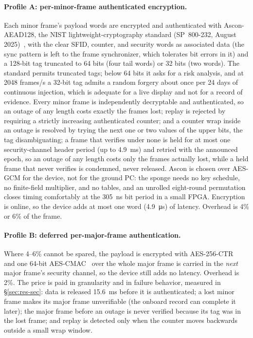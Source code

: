 \documentclass[12pt,letterpaper]{article}
\begin{document}
\paragraph{Profile A: per-minor-frame authenticated encryption.}
Each minor frame's payload words are encrypted and authenticated with Ascon-AEAD128, the
NIST lightweight-cryptography standard (SP~800-232, August 2025)~\cite{nist800232}, with
the clear SFID, counter, and security words as associated data (the sync pattern is left to
the frame synchronizer, which tolerates bit errors in it) and a 128-bit tag truncated to
64 bits (four tail words) or 32 bits (two words). The standard permits truncated tags; below 64 bits it asks
for a risk analysis, and at 2048 frames/s a 32-bit tag admits a random forgery about once
per 24 days of continuous injection, which is adequate for a live display and not for a
record of evidence. Every minor frame is independently decryptable and authenticated, so an
outage of any length costs exactly the frames lost; replay is rejected by requiring a
strictly increasing authenticated counter; and a counter wrap inside an outage is resolved
by trying the next one or two values of the upper bits, the tag disambiguating; a frame
that verifies under none is held for at most one security-channel header period (up to
4.9~ms) and retried with the announced epoch, so an outage of any length costs only the
frames actually lost, while a held frame that never verifies is condemned, never released.
Ascon is
chosen over AES-GCM for the device, not for the ground PC: the sponge needs no key
schedule, no finite-field multiplier, and no tables, and an unrolled eight-round
permutation closes timing comfortably at the 305~ns bit period in a small FPGA. Encryption
is online, so the device adds at most one word (4.9~\si{\micro\second}) of latency.
Overhead is 4\% or 6\% of the frame.

\paragraph{Profile B: deferred per-major-frame authentication.}
Where 4--6\% cannot be spared, the payload is encrypted with AES-256-CTR~\cite{nist38a} and
one 64-bit AES-CMAC~\cite{nist38b} over the whole major frame is carried in the \emph{next}
major frame's security channel, so the device still adds no latency. Overhead is 2\%. The
price is paid in granularity and in failure behavior, measured in \S\ref{sec:res-sec}: data
is released 15.6~ms before it is authenticated; a lost minor frame makes its major frame
unverifiable (the onboard record can complete it later); the major frame before an outage
is never verified because its tag was in the lost frame; and replay is detected only when
the counter moves backwards outside a small wrap window.
\end{document}
